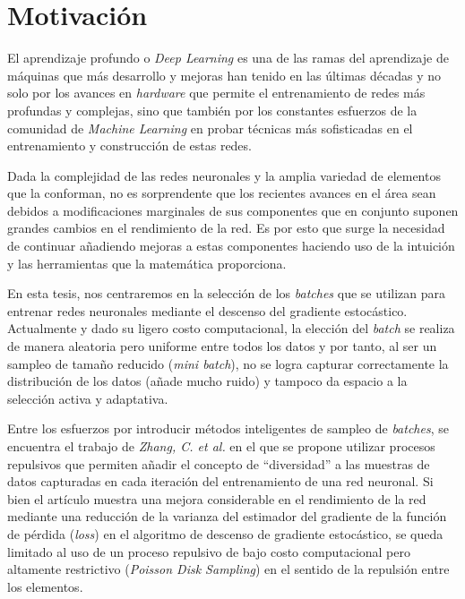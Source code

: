 \section{Motivación}

El aprendizaje profundo o \textit{Deep Learning} es una de las ramas del aprendizaje de máquinas que más desarrollo y mejoras han tenido en las últimas décadas y no solo por los avances en \textit{hardware} que permite el entrenamiento de redes más profundas y complejas, sino que también por los constantes esfuerzos de la comunidad de \textit{Machine Learning} en probar técnicas más sofisticadas en el entrenamiento y construcción de estas redes.

\vspace{0.2cm}

Dada la complejidad de las redes neuronales y la amplia variedad de elementos que la conforman, no es sorprendente que los recientes avances en el área sean debidos a modificaciones marginales de sus componentes que en conjunto suponen grandes cambios en el rendimiento de la red. Es por esto que surge la necesidad de continuar añadiendo mejoras a estas componentes haciendo uso de la intuición y las herramientas que la matemática proporciona. 

\vspace{0.2cm}

En esta tesis, nos centraremos en la selección de los \textit{batches} que se utilizan para entrenar redes neuronales mediante el descenso del gradiente estocástico. Actualmente y dado su ligero costo computacional, la elección del \textit{batch} se realiza de manera aleatoria pero uniforme entre todos los datos y por tanto, al ser un sampleo de tamaño reducido (\textit{mini batch}), no se logra capturar correctamente la distribución de los datos (añade mucho ruido) y tampoco da espacio a la selección activa y adaptativa. 

\vspace{0.2cm}

Entre los esfuerzos por introducir métodos inteligentes de sampleo de \textit{batches}, se encuentra el trabajo de \textit{Zhang, C. et al.} \cite{https://doi.org/10.48550/arxiv.1804.02772} en el que se propone utilizar procesos repulsivos que permiten añadir el concepto de ``diversidad'' a las muestras de datos capturadas en cada iteración del entrenamiento de una red neuronal. Si bien el artículo muestra una mejora considerable en el rendimiento de la red mediante una reducción de la varianza del estimador del gradiente de la función de pérdida (\textit{loss}) en el algoritmo de descenso de gradiente estocástico, se queda limitado al uso de un proceso repulsivo de bajo costo computacional pero altamente restrictivo (\textit{Poisson Disk Sampling}) en el sentido de la repulsión entre los elementos.


